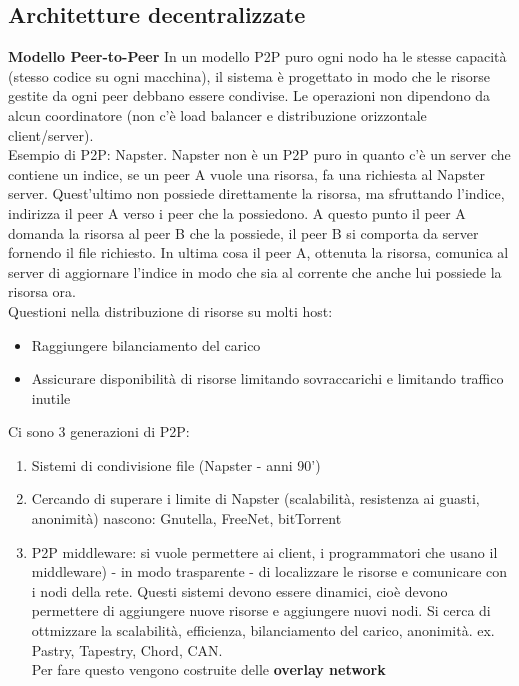\documentclass[12pt,italian]{report}
\begin{document}
\subsection{Architetture decentralizzate}
\bigbreak
\noindent \textbf{Modello Peer-to-Peer} 
\bigbreak
In un modello P2P puro ogni nodo ha le stesse capacità (stesso codice su ogni macchina), il sistema è progettato in modo che le risorse gestite da ogni peer debbano essere condivise. Le operazioni non dipendono da alcun coordinatore (non c'è load balancer e distribuzione orizzontale client/server). \\ Esempio di P2P: Napster. Napster non è un P2P puro in quanto c'è un server che contiene un indice, se un peer A vuole una risorsa, fa una richiesta al Napster server. Quest'ultimo non possiede direttamente la risorsa, ma sfruttando l'indice, indirizza il peer A verso i peer che la possiedono. A questo punto il peer A domanda la risorsa al peer B che la possiede, il peer B si comporta da server fornendo il file richiesto. In ultima cosa il peer A, ottenuta la risorsa, comunica al server di aggiornare l'indice in modo che sia al corrente che anche lui possiede la risorsa ora. \\ Questioni nella distribuzione di risorse su molti host:
\begin{itemize}
    \item Raggiungere bilanciamento del carico
    \item Assicurare disponibilità di risorse limitando sovraccarichi e limitando traffico inutile
\end{itemize}
Ci sono 3 generazioni di P2P:
\begin{enumerate}
    \item Sistemi di condivisione file (Napster - anni 90')
    \item Cercando di superare i limite di Napster (scalabilità, resistenza ai guasti, anonimità) nascono: Gnutella, FreeNet, bitTorrent
    \item P2P middleware: si vuole permettere ai client, i programmatori che usano il middleware) - in modo trasparente - di localizzare le risorse e comunicare con i nodi della rete. Questi sistemi devono essere dinamici, cioè devono permettere di aggiungere nuove risorse e aggiungere nuovi nodi. Si cerca di ottmizzare la scalabilità, efficienza, bilanciamento del carico, anonimità. ex. Pastry, Tapestry, Chord, CAN. \\ Per fare questo vengono costruite delle \textbf{overlay network}
\end{enumerate}
\end{document}
